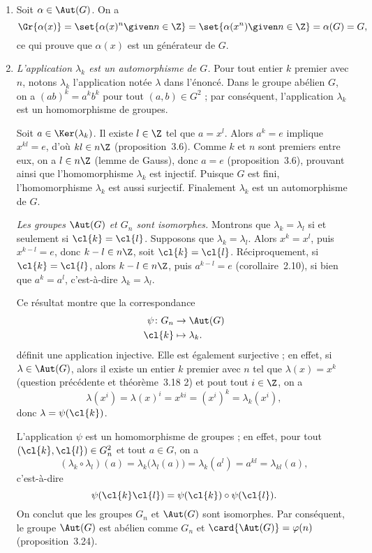 
\begin{enumerate}
  \item %
    Soit $\alpha\in\Aut(G)$.
    On a
    \[
      \Gr{\alpha(x)}
        = \set{\alpha(x)^n\given n\in\Z}
        = \set{\alpha(x^n)\given n\in\Z}
        = \alpha(G)
        = G,
    \]
    ce qui prouve que $\alpha(x)$ est un générateur de $G$.

  \item %
    \emph{L'application $\lambda_k$ est un automorphisme de $G$.}
    Pour tout entier $k$ premier avec $n$, notons $\lambda_k$ l'application notée $\lambda$ dans l'énoncé.
    Dans le groupe abélien $G$, on a $(ab)^k = a^k b^k$ pour tout $(a, b)\in G^2$ ; par conséquent, l'application $\lambda_k$ est un homomorphisme de groupes.

    Soit $a\in\Ker(\lambda_k)$.
    Il existe $l\in\Z$ tel que $a = x^l$.
    Alors $a^k = e$ implique $x^{kl} = e$, d'où $kl\in n\Z$ (proposition~3.6).
    Comme $k$ et $n$ sont premiers entre eux, on a $l\in n\Z$ (lemme de Gauss), donc $a = e$ (proposition~3.6), prouvant ainsi que l'homomorphisme $\lambda_k$ est injectif.
    Puisque $G$ est fini, l'homomorphisme $\lambda_k$ est aussi surjectif.
    Finalement $\lambda_k$ est un automorphisme de $G$.

    \emph{Les groupes $\Aut(G)$ et $G_n$ sont isomorphes.}
    Montrons que $\lambda_k = \lambda_l$ si et seulement si $\cl{k} = \cl{l}$.
    Supposons que $\lambda_k = \lambda_l$.
    Alors $x^k = x^l$, puis $x^{k - l} = e$, donc $k - l\in n\Z$, soit $\cl{k} = \cl{l}$.
    Réciproquement, si $\cl{k} = \cl{l}$, alors $k - l\in n\Z$, puis $a^{k - l} = e$ (corollaire~2.10), si bien que $a^k = a^l$, c'est-à-dire $\lambda_k = \lambda_l$.

    Ce résultat montre que la correspondance
    \begin{align*}
      \psi\colon G_n &\to \Aut(G) \\
                \cl{k} &\mapsto \lambda_k.
    \end{align*}
    définit une application injective.
    Elle est également surjective ; en effet, si $\lambda\in\Aut(G)$, alors il existe un entier $k$ premier avec $n$ tel que $\lambda(x) = x^k$ (question précédente et théorème~3.18 2) et pout tout $i\in\Z$, on a
    \[
      \lambda(x^i) = \lambda(x)^i = x^{ki} = (x^i)^k = \lambda_k(x^i),
    \]
    donc $\lambda = \psi(\cl{k})$.

    L'application $\psi$ est un homomorphisme de groupes ; en effet, pour tout $(\cl{k}, \cl{l})\in G_n^2$ et tout $a\in G$, on a
    \[
      (\lambda_k\circ\lambda_l)(a)
        = \lambda_k\bigl(\lambda_l(a)\bigr)
        = \lambda_k(a^l)
        = a^{kl}
        = \lambda_{kl}(a),
    \]
    c'est-à-dire
    \[
      \psi(\cl{k}\cl{l}) = \psi(\cl{k})\circ\psi(\cl{l}).
    \]
    On conclut que les groupes $G_n$ et $\Aut(G)$ sont isomorphes.
    Par conséquent, le groupe $\Aut(G)$ est abélien comme $G_n$ et $\card{\Aut(G)} = \varphi(n)$ (proposition~3.24).


\end{enumerate}
